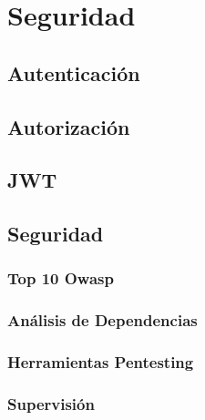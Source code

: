 \chapter{Seguridad}

\section{Autenticación}
\section{Autorización}
\section{JWT}
\section{Seguridad}
\subsection{Top 10 Owasp}
\subsection{Análisis de Dependencias}
\subsection{Herramientas Pentesting}
\subsection{Supervisión}

